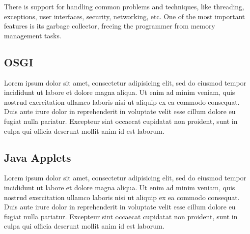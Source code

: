 There is support for handling common problems and techniques, like threading, exceptions, user interfaces, security, networking, etc.
One of the most important features is its garbage collector, freeing the programmer from memory management tasks.


\subsection{OSGI} %
\label{sub:osgi}

Lorem ipsum dolor sit amet, consectetur adipisicing elit, sed do eiusmod tempor incididunt ut labore et dolore magna aliqua. Ut enim ad minim veniam, quis nostrud exercitation ullamco laboris nisi ut aliquip ex ea commodo consequat. Duis aute irure dolor in reprehenderit in voluptate velit esse cillum dolore eu fugiat nulla pariatur. Excepteur sint occaecat cupidatat non proident, sunt in culpa qui officia deserunt mollit anim id est laborum.


\subsection{Java Applets} %
\label{sub:javaapplets}

Lorem ipsum dolor sit amet, consectetur adipisicing elit, sed do eiusmod tempor incididunt ut labore et dolore magna aliqua. Ut enim ad minim veniam, quis nostrud exercitation ullamco laboris nisi ut aliquip ex ea commodo consequat. Duis aute irure dolor in reprehenderit in voluptate velit esse cillum dolore eu fugiat nulla pariatur. Excepteur sint occaecat cupidatat non proident, sunt in culpa qui officia deserunt mollit anim id est laborum.



